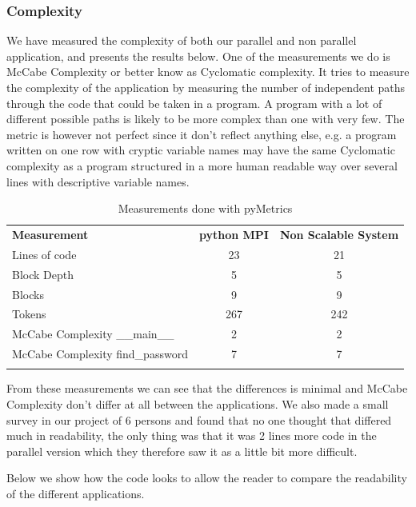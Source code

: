 \documentclass{article}
\begin{document}
\subsubsection{Complexity}
We have measured the complexity of both our parallel and non parallel
application, and presents the results below. One of the measurements
we do is McCabe Complexity\cite{mccabe1976complexity} or better know as
Cyclomatic complexity. It tries to measure the complexity of the 
application by measuring the number of independent paths through the
code that could be taken in a program. A program with a lot of different
possible paths is likely to be more complex than one with very few. The
metric is however not perfect since it don't reflect anything else, e.g.  a
program written on one row with cryptic variable names may have the same
Cyclomatic complexity as a program structured in a more human readable way
over several lines with descriptive variable names.

\begin{table}[h!]
\begin{tabular}{l c c}
  \rowcolor[gray]{0.5}
  {\bf Measurement} & {\bf python MPI} & {\bf Non Scalable System} \\
  Lines of code &  23  &  21 \\
  Block Depth   &   5  &   5  \\
  Blocks        &   9  &   9  \\
  Tokens        & 267  & 242  \\
  McCabe Complexity \_\_main\_\_ & 2  & 2 \\
  McCabe Complexity find\_password & 7  & 7  \\
\rowcolor[gray]{0.5}
\end{tabular}
\caption{ Measurements done with pyMetrics\cite{pymetrics}}
\end{table}
From these measurements we can see that the differences is minimal and
McCabe Complexity\cite{mccabe1976complexity} don't differ at all between
the applications. We also made a small survey in our project of 6 persons
and found that no one thought that differed much in readability, the only
thing was that it was 2 lines more code in the parallel version which they
therefore saw it as a little bit more difficult. 
\newline

Below we show how the code looks to allow the reader to compare the readability
of the different applications. 
\end{document}
